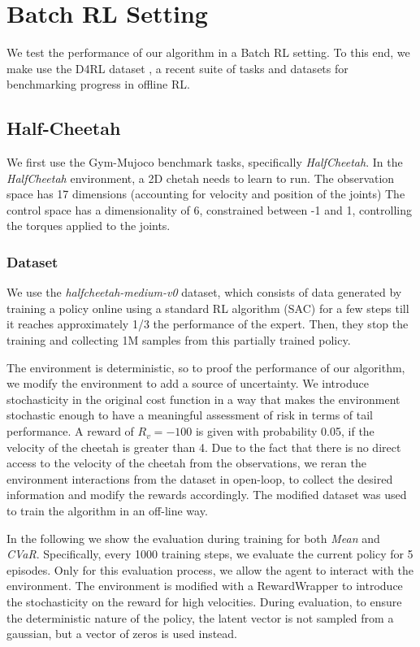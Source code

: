 
\section{Batch RL Setting}
We test the performance of our algorithm in a Batch RL setting.
To this end, we make use the D4RL dataset \cite{d4rl}, a recent suite of tasks and datasets for
benchmarking progress in offline RL.
\subsection{Half-Cheetah}
We first use the Gym-Mujoco benchmark tasks, specifically \textit{HalfCheetah}.
In the \textit{HalfCheetah} environment, a 2D chetah needs to learn to run.
The observation space has 17 dimensions (accounting for velocity and position of the joints)
The control space has a dimensionality of 6, constrained between -1 and 1, 
controlling the torques applied to the joints.

\subsubsection{Dataset}
We use the \textit{halfcheetah-medium-v0} dataset, which consists of data generated by
training a policy online using a standard RL algorithm (SAC) for a few steps till it reaches 
approximately 1/3 the performance of the expert. Then, they stop the training
and collecting 1M samples from this partially trained policy.

The environment is deterministic, so to proof the performance of our algorithm, we modify the environment to
add a source of uncertainty.
We introduce stochasticity in the original cost function in a way that 
makes the environment stochastic enough to have a meaningful assessment of risk in terms of 
tail performance.
A reward of $R_v=-100$ is given with probability 0.05, if the velocity of the cheetah is greater than 4.
Due to the fact that there is no direct access to the velocity of the cheetah from the observations,
we reran the environment interactions from the dataset in open-loop, to collect the desired information and 
modify the rewards accordingly.
The modified dataset was used to train the algorithm in an off-line way.

In the following we show the evaluation during training for both \textit{Mean} and
\textit{CVaR}.
Specifically, every 1000 training steps, we evaluate the current policy for 5 episodes.
Only for this evaluation process, we allow the agent to interact with the environment.
The environment is modified with a RewardWrapper to introduce the stochasticity on the reward for
high velocities.
During evaluation, to ensure the deterministic nature of the policy, 
the latent vector is not sampled from a gaussian, but a vector of zeros is used instead.

